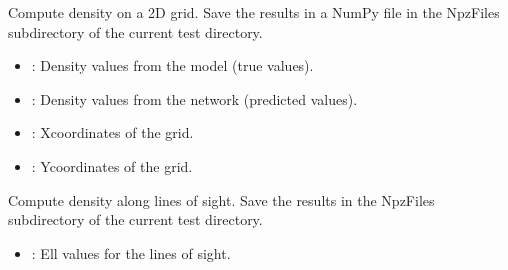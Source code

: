 \documentclass[letterpaper,10pt,english]{sphinxmanual}
\begin{document}
\begin{fulllineitems}
\begin{description}
\end{description}

\begin{fulllineitems}
\label{\detokenize{Calculator:Calculator.Calculator.compute_density_grid}}
\pysigstartsignatures
{}
\pysigstopsignatures
\sphinxAtStartPar
Compute density on a 2D grid.
Save the results in a NumPy file in the NpzFiles subdirectory of the current test directory.
\begin{description}
\begin{itemize}
\item {} 
\sphinxAtStartPar
{}: Density values from the model (true values).

\item {} 
\sphinxAtStartPar
{}: Density values from the network (predicted values).

\item {} 
\sphinxAtStartPar
{}: X\sphinxhyphen{}coordinates of the grid.

\item {} 
\sphinxAtStartPar
{}: Y\sphinxhyphen{}coordinates of the grid.

\end{itemize}

\end{description}

\end{fulllineitems}


\begin{fulllineitems}
\label{\detokenize{Calculator:Calculator.Calculator.compute_density_sight}}
\pysigstartsignatures
{}
\pysigstopsignatures
\sphinxAtStartPar
Compute density along lines of sight.
Save the results in the NpzFiles subdirectory of the current test directory.
\begin{description}
\begin{itemize}
\item {} 
\sphinxAtStartPar
{}: Ell values for the lines of sight.


\end{itemize}
\end{description}
\end{fulllineitems}
\end{fulllineitems}
\end{document}
